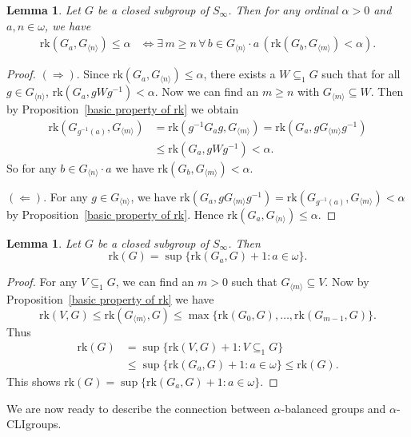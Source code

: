 \documentclass[11pt]{amsart}
\newtheorem{lemma}[theorem]{Lemma}
\theoremstyle{definition}
\theoremstyle{remark}
\numberwithin{equation}{section}
\def\gnb#1{G_{\langle #1\rangle}}
\def\hier#1{$#1$-CLI}
\def\rk{\mathrm{rk}}
\begin{document}
\begin{lemma}\label{computation of open set rank}
    Let $G$ be a closed subgroup of $S_\infty$. Then for any ordinal $\alpha>0$ and $a,n\in\omega$, we have
    \begin{align*}
        \rk(G_a,\gnb{n})\leq\alpha&\iff\exists\,m\geq n\,\forall\,b\in\gnb{n}\cdot a\,(\rk(G_b,\gnb{m})<\alpha).
    \end{align*}
\end{lemma}
\begin{proof}
    $(\Rightarrow)$. Since $\rk(G_a,\gnb{n})\leq\alpha$, there exists a $W\subseteq_1G$ such that for all $g\in\gnb{n}$, $\rk(G_a,gWg^{-1})<\alpha$. Now we can find an $m\geq n$ with $\gnb{m}\subseteq W$. Then by Proposition~\ref{basic property of rk} we obtain
    \begin{align*}
        \rk(G_{g^{-1}(a)},\gnb{m})&=\rk(g^{-1}G_ag,\gnb{m})=\rk(G_a,g\gnb{m}g^{-1})\\
        &\leq\rk(G_a,gWg^{-1})<\alpha.
    \end{align*}
    So for any $b\in\gnb{n}\cdot a$ we have $\rk(G_b,\gnb{m})<\alpha$.

    $(\Leftarrow)$. For any $g\in\gnb{n}$, we have $\rk(G_a,g\gnb{m}g^{-1})=\rk(G_{g^{-1}(a)},\gnb{m})<\alpha$ by Proposition~\ref{basic property of rk}. Hence $\rk(G_a,\gnb{n})\leq\alpha$.
\end{proof}

\begin{lemma}\label{computation of group rank}
    Let $G$ be a closed subgroup of $S_\infty$. Then
    $$\rk(G)=\sup\{\rk(G_a,G)+1:a\in\omega\}.$$
\end{lemma}
\begin{proof}
    For any $V\subseteq_1G$, we can find an $m>0$ such that $\gnb{m}\subseteq V$. Now by Proposition~\ref{basic property of rk} we have
    $$\rk(V,G)\leq\rk(\gnb{m},G)\leq\max\{\rk(G_0,G),\dots,\rk(G_{m-1},G)\}.$$
    Thus
    \begin{align*}
        \rk(G)&=\sup\{\rk(V,G)+1:V\subseteq_1G\}\\
        &\leq\sup\{\rk(G_a,G)+1:a\in\omega\}\leq\rk(G).
    \end{align*}
    This shows $\rk(G)=\sup\{\rk(G_a,G)+1:a\in\omega\}$.
\end{proof}

We are now ready to describe the connection between $\alpha$-balanced groups and \hier\alpha\space groups.
\end{document}
